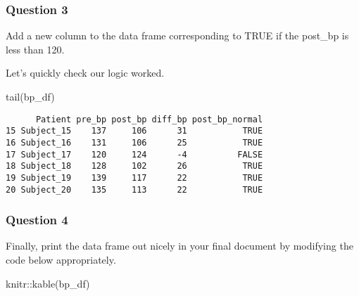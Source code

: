 \documentclass[
  letterpaper,
  DIV=11,
  numbers=noendperiod]{scrartcl}
\newenvironment{Shaded}{\begin{snugshade}}{\end{snugshade}}
\newcommand{\ConstantTok}[1]{\textcolor[rgb]{0.56,0.35,0.01}{#1}}
\newcommand{\DecValTok}[1]{\textcolor[rgb]{0.68,0.00,0.00}{#1}}
\newcommand{\FunctionTok}[1]{\textcolor[rgb]{0.28,0.35,0.67}{#1}}
\newcommand{\NormalTok}[1]{\textcolor[rgb]{0.00,0.23,0.31}{#1}}
\newcommand{\OtherTok}[1]{\textcolor[rgb]{0.00,0.23,0.31}{#1}}
\newcommand{\SpecialCharTok}[1]{\textcolor[rgb]{0.37,0.37,0.37}{#1}}
\begin{document}
\subsubsection{Question 3}\label{question-3-1}

Add a new column to the data frame corresponding to TRUE if the post\_bp
is less than 120.

\begin{Shaded}
\end{Shaded}

Let's quickly check our logic worked.

\begin{Shaded}
\begin{Highlighting}[]
\FunctionTok{tail}\NormalTok{(bp\_df)}
\end{Highlighting}
\end{Shaded}

\begin{verbatim}
      Patient pre_bp post_bp diff_bp post_bp_normal
15 Subject_15    137     106      31           TRUE
16 Subject_16    131     106      25           TRUE
17 Subject_17    120     124      -4          FALSE
18 Subject_18    128     102      26           TRUE
19 Subject_19    139     117      22           TRUE
20 Subject_20    135     113      22           TRUE
\end{verbatim}

\subsubsection{Question 4}\label{question-4-1}

Finally, print the data frame out nicely in your final document by
modifying the code below appropriately.

\begin{Shaded}
\begin{Highlighting}[]
\NormalTok{knitr}\SpecialCharTok{::}\FunctionTok{kable}\NormalTok{(bp\_df)}
\end{Highlighting}
\end{Shaded}
\end{document}
